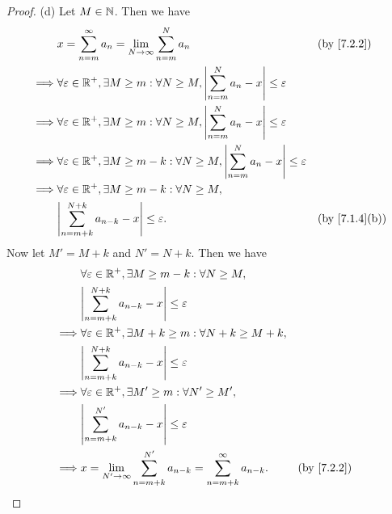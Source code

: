 \begin{proof}{(d)}
  Let \(M \in \mathbb{N}\).
  Then we have
  \begin{align*}
             & x = \sum_{n = m}^\infty a_n = \lim_{N \to \infty} \sum_{n = m}^N a_n                                                 &  & \by{7.2.2}    \\
    \implies & \forall \varepsilon \in \R^+, \exists M \geq m : \forall N \geq M, \abs{\sum_{n = m}^N a_n - x} \leq \varepsilon                        \\
    \implies & \forall \varepsilon \in \R^+, \exists M \geq m : \forall N \geq M, \abs{\sum_{n = m}^N a_n - x} \leq \varepsilon                        \\
    \implies & \forall \varepsilon \in \R^+, \exists M \geq m - k : \forall N \geq M, \abs{\sum_{n = m}^N a_n - x} \leq \varepsilon                    \\
    \implies & \forall \varepsilon \in \R^+, \exists M \geq m - k : \forall N \geq M,                                                                  \\
             & \abs{\sum_{n = m + k}^{N + k} a_{n - k} - x} \leq \varepsilon.                                                       &  & \by{7.1.4}[b]
  \end{align*}
  Now let \(M' = M + k\) and \(N' = N + k\).
  Then we have
  \begin{align*}
             & \forall \varepsilon \in \R^+, \exists M \geq m - k : \forall N \geq M,                                        \\
             & \abs{\sum_{n = m + k}^{N + k} a_{n - k} - x} \leq \varepsilon                                                 \\
    \implies & \forall \varepsilon \in \R^+, \exists M + k \geq m : \forall N + k \geq M + k,                                \\
             & \abs{\sum_{n = m + k}^{N + k} a_{n - k} - x} \leq \varepsilon                                                 \\
    \implies & \forall \varepsilon \in \R^+, \exists M' \geq m : \forall N' \geq M',                                         \\
             & \abs{\sum_{n = m + k}^{N'} a_{n - k} - x} \leq \varepsilon                                                    \\
    \implies & x = \lim_{N' \to \infty} \sum_{n = m + k}^{N'} a_{n - k} = \sum_{n = m + k}^\infty a_{n - k}. &  & \by{7.2.2}
  \end{align*}
\end{proof}

